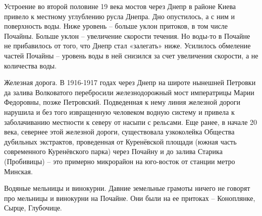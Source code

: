 



Устроение во второй половине 19 века мостов через Днепр в районе Киева привело к местному углублению русла Днепра. Дно опустилось, а с ним и поверхность воды. Ниже уровень – больше уклон притоков, в том числе Почайны. Больше уклон – увеличение скорости течения. Но воды-то в Почайне не прибавилось от того, что Днепр стал «залегать» ниже. Усилилось обмеление частей Почайны – уровень воды в ней снизился за счет увеличения скорости, а не количества воды.

Железная дорога. В 1916-1917 годах через Днепр на широте нынешней Петровки да залива Волковатого перебросили железнодорожный мост императрицы Марии Федоровны, позже Петровский. Подведенная к нему линия железной дороги нарушила и без того извращенную человеком водную систему и привела к заболачиванию местности к северу от насыпи с рельсами. Еще ранее, в начале 20 века, севернее этой железной дороги, существовала узкоколейка Общества дубильных экстрактов, проведенная от Куренёвской площади (южная часть современного Куренёвского парка) через Почайну и до залива Старика (Пробивицы) – это примерно микрорайон на юго-восток от станции метро Минская.

Водяные мельницы и винокурни. Давние земельные грамоты ничего не говорят про мельницы и винокурни на Почайне. Они были на ее притоках – Коноплянке, Сырце, Глубочице. 


